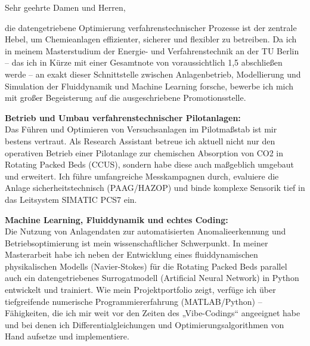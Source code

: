 \documentclass[11pt,a4paper]{moderncv} %
\begin{document}

\date{Berlin, \today}

\opening{Sehr geehrte Damen und Herren,}

\makelettertitle

\justifying

die datengetriebene Optimierung verfahrenstechnischer Prozesse ist der zentrale Hebel, um Chemieanlagen effizienter, sicherer und flexibler zu betreiben. Da ich in meinem Masterstudium der Energie- und Verfahrenstechnik an der TU Berlin – das ich in Kürze mit einer Gesamtnote von voraussichtlich 1,5 abschließen werde – an exakt dieser Schnittstelle zwischen Anlagenbetrieb, Modellierung und Simulation der Fluiddynamik und Machine Learning forsche, bewerbe ich mich mit großer Begeisterung auf die ausgeschriebene Promotionsstelle.

\textbf{Betrieb und Umbau verfahrenstechnischer Pilotanlagen:}\\
Das Führen und Optimieren von Versuchsanlagen im Pilotmaßstab ist mir bestens vertraut. Als Research Assistant betreue ich aktuell nicht nur den operativen Betrieb einer Pilotanlage zur chemischen Absorption von CO2 in Rotating Packed Beds (CCUS), sondern habe diese auch maßgeblich umgebaut und erweitert. Ich führe umfangreiche Messkampagnen durch, evaluiere die Anlage sicherheitstechnisch (PAAG/HAZOP) und binde komplexe Sensorik tief in das Leitsystem SIMATIC PCS7 ein.

\textbf{Machine Learning, Fluiddynamik und echtes Coding:}\\
Die Nutzung von Anlagendaten zur automatisierten Anomalieerkennung und Betriebsoptimierung ist mein wissenschaftlicher Schwerpunkt. In meiner Masterarbeit habe ich neben der Entwicklung eines fluiddynamischen physikalischen Modells (Navier-Stokes) für die Rotating Packed Beds parallel auch ein datengetriebenes Surrogatmodell (Artificial Neural Network) in Python entwickelt und trainiert. Wie mein Projektportfolio zeigt, verfüge ich über tiefgreifende numerische Programmiererfahrung (MATLAB/Python) – Fähigkeiten, die ich mir weit vor den Zeiten des „Vibe-Codings“ angeeignet habe und bei denen ich Differentialgleichungen und Optimierungsalgorithmen von Hand aufsetze und implementiere.
\end{document}
